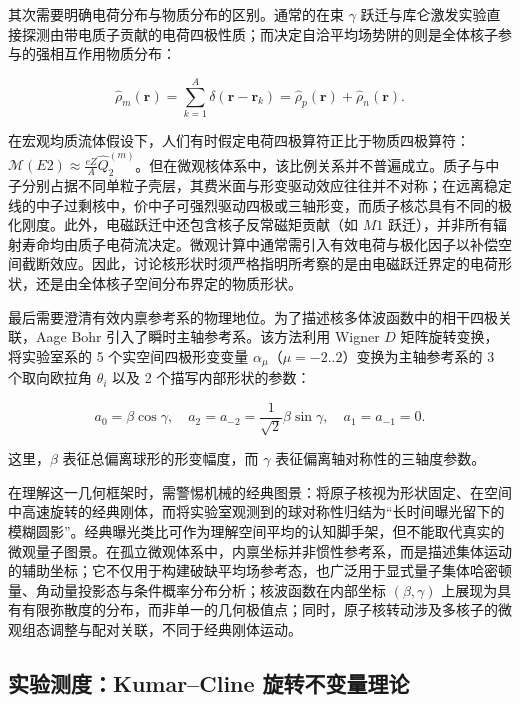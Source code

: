 其次需要明确电荷分布与物质分布的区别。通常的在束 $\gamma$ 跃迁与库仑激发实验直接探测由带电质子贡献的电荷四极性质；而决定自洽平均场势阱的则是全体核子参与的强相互作用物质分布：

\begin{equation}\label{eq:1-2-11}
\hat{\rho}_m(\mathbf{r}) = \sum_{k=1}^A \delta(\mathbf{r} - \mathbf{r}_k) = \hat{\rho}_p(\mathbf{r}) + \hat{\rho}_n(\mathbf{r}).
\end{equation}

在宏观均质流体假设下，人们有时假定电荷四极算符正比于物质四极算符：$\mathcal{M}(E2) \approx \frac{eZ}{A} \hat{Q}_2^{(m)}$。但在微观核体系中，该比例关系并不普遍成立。质子与中子分别占据不同单粒子壳层，其费米面与形变驱动效应往往并不对称；在远离稳定线的中子过剩核中，价中子可强烈驱动四极或三轴形变，而质子核芯具有不同的极化刚度。此外，电磁跃迁中还包含核子反常磁矩贡献（如 $M1$ 跃迁），并非所有辐射寿命均由质子电荷流决定。微观计算中通常需引入有效电荷与极化因子以补偿空间截断效应。因此，讨论核形状时须严格指明所考察的是由电磁跃迁界定的电荷形状，还是由全体核子空间分布界定的物质形状。

最后需要澄清有效内禀参考系的物理地位。为了描述核多体波函数中的相干四极关联，Aage Bohr \cite{bohr-1952-surface-particle-coupling} 引入了瞬时主轴参考系。该方法利用 Wigner $D$ 矩阵旋转变换，将实验室系的 5 个实空间四极形变变量 $\alpha_\mu$（$\mu=-2..2$）变换为主轴参考系的 3 个取向欧拉角 $\theta_i$ 以及 2 个描写内部形状的参数：

\begin{equation}\label{eq:1-2-12}
a_0 = \beta \cos\gamma, \quad a_2 = a_{-2} = \frac{1}{\sqrt{2}} \beta \sin\gamma, \quad a_1 = a_{-1} = 0.
\end{equation}

这里，$\beta$ 表征总偏离球形的形变幅度，而 $\gamma$ 表征偏离轴对称性的三轴度参数。

在理解这一几何框架时，需警惕机械的经典图景：将原子核视为形状固定、在空间中高速旋转的经典刚体，而将实验室观测到的球对称性归结为“长时间曝光留下的模糊圆影”。经典曝光类比可作为理解空间平均的认知脚手架，但不能取代真实的微观量子图景。在孤立微观体系中，内禀坐标并非惯性参考系，而是描述集体运动的辅助坐标；它不仅用于构建破缺平均场参考态，也广泛用于显式量子集体哈密顿量、角动量投影态与条件概率分布分析；核波函数在内部坐标 $(\beta, \gamma)$ 上展现为具有有限弥散度的分布，而非单一的几何极值点；同时，原子核转动涉及多核子的微观组态调整与配对关联，不同于经典刚体运动。

\subsection{实验测度：Kumar--Cline 旋转不变量理论}\label{sec:1-2-3}

